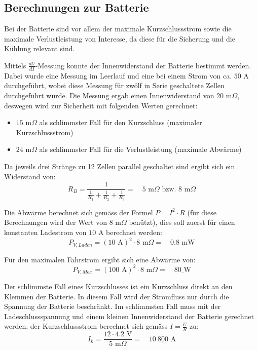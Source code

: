 \subsection{Berechnungen zur Batterie}

Bei der Batterie sind vor allem der maximale Kurzschlussstrom sowie die maximale Verlustleistung von Interesse, da diese für die Sicherung und die Kühlung relevant sind.

Mittels $\frac{dU}{dI}$-Messung konnte der Innenwiderstand der Batterie bestimmt werden. Dabei wurde eine Messung im Leerlauf und eine bei einem Strom von ca. $50$ A durchgeführt, wobei diese Messung für zwölf in Serie geschaltete Zellen durchgeführt wurde. Die Messung ergab einen Innenwiderstand von $20$ m$\Omega$, deswegen wird zur Sicherheit mit folgenden Werten gerechnet:
\begin{itemize}
	\item $15$ m$\Omega$ als schlimmster Fall für den Kurzschluss (maximaler Kurzschlussstrom)
	\item $24$ m$\Omega$ als schlimmster Fall für die Verlustleistung (maximale Abwärme)
\end{itemize}

Da jeweils drei Stränge zu 12 Zellen parallel geschaltet sind ergibt sich ein Widerstand von:
\begin{equation*}
	R_B=\frac{1}{\frac{1}{R_1}+\frac{1}{R_2}+\frac{1}{R_3}}=\quad 5\text{ m}\Omega\text{ bzw. } 8\text{ m}\Omega
\end{equation*}

Die Abwärme berechnet sich gemäss der Formel $P=I^2\cdot R$ (für diese Berechnungen wird der Wert von $8$ m$\Omega$ benützt), dies soll zuerst für einen konstanten Ladestrom von $10$ A berechnet werden:
\begin{equation*}
	P_{V,Laden}=\left(10\text{ A}\right)^2\cdot8\text{ m}\Omega=\quad\underline{0.8\text{ mW}}
\end{equation*}

Für den maximalen Fahrstrom ergibt sich eine Abwärme von:
\begin{equation*}
	P_{V,Max}=\left(100\text{ A}\right)^2\cdot8\text{ m}\Omega=\quad\underline{80\text{ W}}
\end{equation*}

Der schlimmste Fall eines Kurzschlusses ist ein Kurzschluss direkt an den Klemmen der Batterie. In diesem Fall wird der Stromfluss nur durch die Spannung der Batterie beschränkt. Im schlimmsten Fall muss mit der Ladeschlussspannung und einem kleinen Innenwiderstand der Batterie gerechnet werden, der Kurzschlussstrom berechnet sich gemäss $I=\frac{U}{R}$ zu:
\begin{equation*}
	I_k=\frac{12\cdot 4.2\text{ V}}{5\text{ m}\Omega}=\quad\underline{10\ 800\text{ A}}
\end{equation*}

\newpage